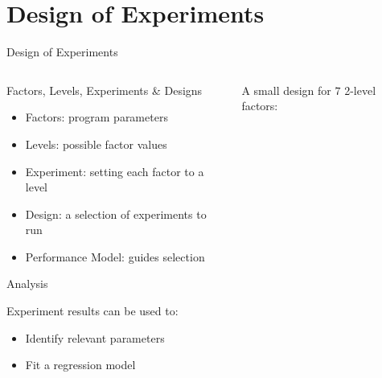 \documentclass[10pt, compress, aspectratio=169, xcolor={table,usenames,dvipsnames}]{beamer}
\begin{document}
\section{Design of Experiments}
\label{sec:org77bd7a3}
\begin{frame}[label={sec:org4ed68ef}]{Design of Experiments}
\begin{columns}
\begin{column}{0.5\columnwidth}
\begin{block}{Factors, Levels, Experiments \& Designs}
\vspace{.2cm}

\begin{itemize}
\item \alert{Factors}: program \alert{parameters}
\item \alert{Levels}: possible factor \alert{values}
\item \alert{Experiment}: setting each factor to a level
\item \alert{Design}: a \alert{selection} of experiments to \alert{run}
\item \alert{Performance Model}: guides \alert{selection}
\end{itemize}

\begin{block}{Analysis}
\vspace{.2cm}

\alert{Experiment results} can be used to:

\begin{itemize}
\item Identify \alert{relevant parameters}
\item Fit a \alert{regression model}
\end{itemize}
\end{block}
\end{block}
\end{column}

\begin{column}{0.5\columnwidth}
\vspace{.4cm}
\begin{center}

A \alert{small design} for \(7\) \alert{2-level factors}:

\end{center}


\end{column}
\end{columns}
\end{frame}
\end{document}
